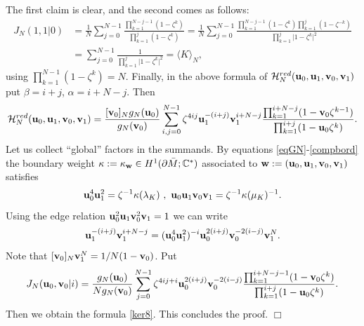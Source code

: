 \documentclass[11pt]{amsart}
\newcommand{\mc}{\mathbb{C}}
\newcommand{\bw}{{\bf w}}
\newcommand{\bu}{{\bf u}}
\newcommand{\bv}{{\bf v}}
\newcommand{\Hh}{{\mathcal H}}
\def\fin{\hfill$\Box$}
\begin{document}
\proof The first claim is clear, and the second comes as follows:
\begin{align*}
J_N(1,1 \vert 0) & =   \frac{1}{N} \sum_{j=0}^{N-1}
    \frac{\prod_{k=1}^{N-j-1}(1-\zeta^{k})}{
    \prod_{k=1}^{j}(1-\zeta^{k})} = \frac{1}{N} \sum_{j=0}^{N-1}
    \frac{\prod_{k=1}^{N-j-1}(1-\zeta^{k})\prod_{k=1}^{j}(1-\zeta^{-k})}{
    \prod_{k=1}^{j} \vert 1-\zeta^{k}\vert^2} \\ & = \sum_{j=0}^{N-1}
    \frac{1}{\prod_{k=1}^{j} \vert 1-\zeta^{k}\vert^2} = \langle K \rangle_N,
    \end{align*}
using $\textstyle \prod_{k=1}^{N-1}(1-\zeta^{k}) = N$. Finally, in the above formula of $\Hh_{N}^{red}(\bu_0,\bu_1,\bv_0,\bv_1)$ put $\beta = i+j$,  $\alpha = i+N-j$. Then
$$\Hh_{N}^{red}(\bu_0,\bu_1,\bv_0,\bv_1)   = \frac{[\bv_0]_Ng_N(\bu_0)}{g_N(\bv_0)}\sum_{i,j=0}^{N-1}
    \zeta^{4ij} \bu_1^{-(i+j)}\bv_1^{i+N-j}\frac{\prod_{k=1}^{i+N-j}(1-\bv_0\zeta^{k-1})}{
    \prod_{k=1}^{i+j}(1-\bu_0\zeta^{k})}.$$
Let us collect ``global'' factors in the summands. By equations \eqref{eqGN}-\eqref{compbord} the boundary weight $\kappa:= \kappa_\bw\in H^1(\partial \bar M;\mc^*)$ associated to $\bw:=(\bu_0,\bu_1,\bv_0,\bv_1)$ satisfies
\begin{equation*}
\bu_0^{4}\bu_1^{2}  = \zeta^{-1}\kappa(\lambda_K)\ ,\ \bu_0\bu_1\bv_0\bv_1= \zeta^{-1}\kappa(\mu_K)^{-1}.
\end{equation*}
Using the edge relation $\bu_0^{2}\bu_1\bv_0^{2}\bv_1 = 1$ we can write
$$\bu_1^{-(i+j)}\bv_1^{i+N-j} = (\bu_0^4\bu_1^2)^{-i} \bu_0^{2(i+j)}\bv_0^{-2(i-j)}\bv_1^N. $$
Note that $[\bv_0]_N\bv_1^N = 1/N(1-\bv_0)$. Put
$$J_N(\bu_0,\bv_0 \vert i) = \frac{g_N(\bu_0)}{Ng_N(\bv_0)} \sum_{j=0}^{N-1}
    \zeta^{4ij+i}  \bu_0^{2(i+j)}\bv_0^{-2(i-j)} \frac{\prod_{k=1}^{i+N-j-1}(1-\bv_0\zeta^{k})}{
    \prod_{k=1}^{i+j}(1-\bu_0\zeta^{k})}.$$    
Then we obtain the formula \eqref{ker8}. This concludes the proof. \fin
\end{document}
